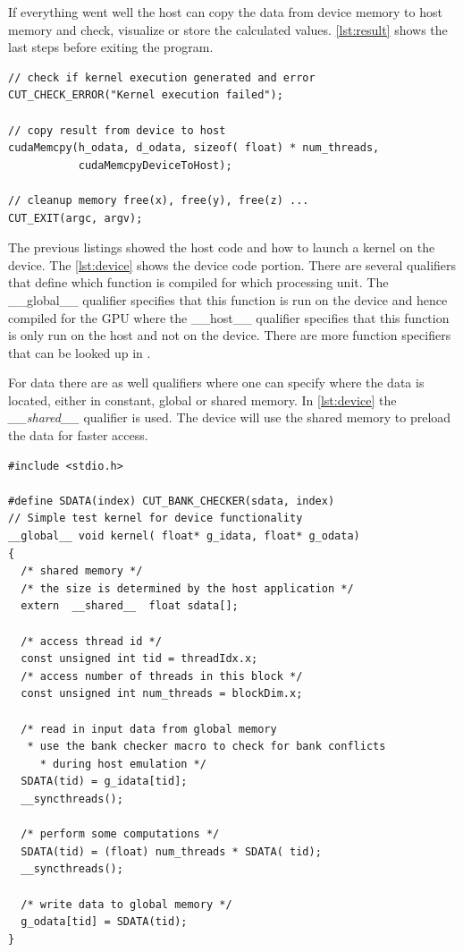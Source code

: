 If everything went well the host can copy the data from device memory
to host memory and check, visualize or store the calculated values.
\autoref{lst:result} shows the last steps before exiting the program.

\begin{lstlisting}[caption=Retrieving of the Results, label=lst:result]
// check if kernel execution generated and error
CUT_CHECK_ERROR("Kernel execution failed");
 
// copy result from device to host
cudaMemcpy(h_odata, d_odata, sizeof( float) * num_threads, 
           cudaMemcpyDeviceToHost);

// cleanup memory free(x), free(y), free(z) ...
CUT_EXIT(argc, argv);
\end{lstlisting} 

The previous listings showed the host code and how to launch a kernel on the
device. The \autoref{lst:device} shows the device code portion. There are
several qualifiers that define which function is compiled for which processing
unit. The \textsf{\_\_global\_\_} qualifier specifies that this function is run
on the device and hence compiled for the \gls{GPU} where the
\textsf{\_\_host\_\_} qualifier specifies that this function is only run on the
host and not on the device. There are more function specifiers that can be
looked up in \citep{citeulike:3325943}.

For data there are as well qualifiers where one can specify where the data is
located, either in constant, global or shared memory. In \autoref{lst:device}
the \textit{\_\_shared\_\_} qualifier is used. The device will use the shared
memory to preload the data for faster access.

\begin{lstlisting}[caption=CUDA device code, label=lst:device]
#include <stdio.h>

#define SDATA(index) CUT_BANK_CHECKER(sdata, index)
// Simple test kernel for device functionality
__global__ void kernel( float* g_idata, float* g_odata) 
{
  /* shared memory */
  /* the size is determined by the host application */
  extern  __shared__  float sdata[];

  /* access thread id */
  const unsigned int tid = threadIdx.x;
  /* access number of threads in this block */
  const unsigned int num_threads = blockDim.x;

  /* read in input data from global memory
   * use the bank checker macro to check for bank conflicts
 	 * during host emulation */
  SDATA(tid) = g_idata[tid];
  __syncthreads();

  /* perform some computations */
  SDATA(tid) = (float) num_threads * SDATA( tid);
  __syncthreads();

  /* write data to global memory */
  g_odata[tid] = SDATA(tid);
} 
\end{lstlisting} 



